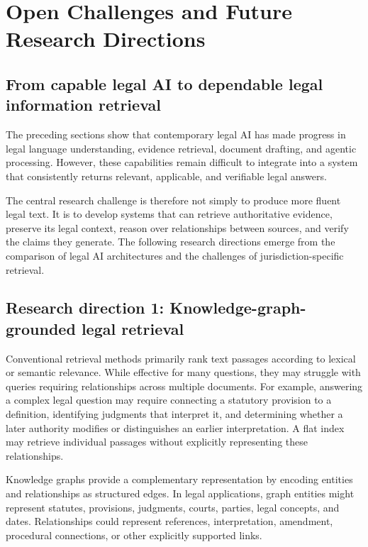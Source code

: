 \section{Open Challenges and Future Research Directions}
\label{sec:future}

\subsection{From capable legal AI to dependable legal information retrieval}

The preceding sections show that contemporary legal AI has made progress in legal language
understanding, evidence retrieval, document drafting, and agentic processing. However, these
capabilities remain difficult to integrate into a system that consistently returns relevant, applicable,
and verifiable legal answers.

The central research challenge is therefore not simply to produce more fluent legal text. It is to
develop systems that can retrieve authoritative evidence, preserve its legal context, reason over
relationships between sources, and verify the claims they generate. The following research directions
emerge from the comparison of legal AI architectures and the challenges of jurisdiction-specific
retrieval.

\subsection{Research direction 1: Knowledge-graph-grounded legal retrieval}

Conventional retrieval methods primarily rank text passages according to lexical or semantic relevance.
While effective for many questions, they may struggle with queries requiring relationships across
multiple documents. For example, answering a complex legal question may require connecting a statutory
provision to a definition, identifying judgments that interpret it, and determining whether a later
authority modifies or distinguishes an earlier interpretation. A flat index may retrieve individual
passages without explicitly representing these relationships.

Knowledge graphs provide a complementary representation by encoding entities and relationships as
structured edges. In legal applications, graph entities might represent statutes, provisions, judgments,
courts, parties, legal concepts, and dates. Relationships could represent references, interpretation,
amendment, procedural connections, or other explicitly supported links.

